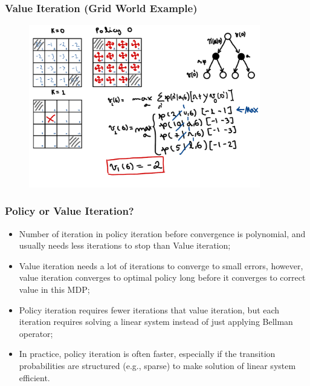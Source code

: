 \begin{frame}
    \frametitle{Value Iteration (Grid World Example)}
    \begin{figure}
        \centering
        \includegraphics[width=0.9\textwidth]{sections/optimization/figures/grid_world_vi_1.pdf}
    \end{figure}
\end{frame}



\begin{frame}
    \frametitle{Policy or Value Iteration?}
    \begin{itemize}
        \item Number of iteration in policy iteration before convergence is polynomial, and usually needs 
        less iterations to stop than Value iteration;
        \item Value iteration needs a lot of iterations to converge to small errors, however, value iteration 
        converges to optimal policy long before it converges to correct value in this MDP;
        \item Policy iteration requires fewer iterations that value iteration, but each iteration requires 
        solving a linear system instead of just applying Bellman operator;
        \item In practice, policy iteration is often faster, especially if the transition probabilities 
        are structured (e.g., sparse) to make solution of linear system efficient.
    \end{itemize}
\end{frame}



